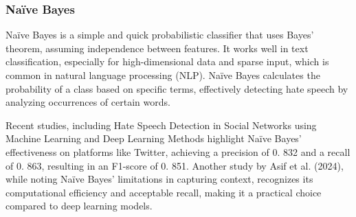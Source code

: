\subsubsection{Na\"ive Bayes}

\noindent
Naïve Bayes is a simple and quick probabilistic classifier that uses Bayes' theorem, assuming independence between features. It works well in text classification, especially for high-dimensional data and sparse input, which is common in natural language processing (NLP). Naïve Bayes calculates the probability of a class based on specific terms, effectively detecting hate speech by analyzing occurrences of certain words.

Recent studies, including Hate Speech Detection in Social Networks using Machine Learning and Deep Learning Methods \citep{fieri2023offensive} highlight Naïve Bayes' effectiveness on platforms like Twitter, achieving a precision of 0. 832 and a recall of 0. 863, resulting in an F1-score of 0. 851. Another study by Asif et al. (2024), while noting Naïve Bayes' limitations in capturing context, recognizes its computational efficiency and acceptable recall, making it a practical choice compared to deep learning models.